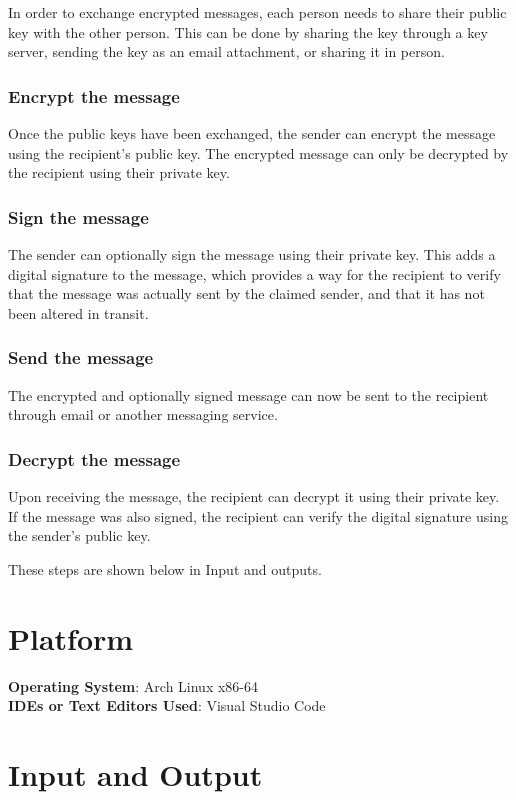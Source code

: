 \documentclass[openany]{book}
\begin{document}
In order to exchange encrypted messages, each person needs to share their public key with the other person. This can be done by sharing the key through a key server, sending the key as an email attachment, or sharing it in person.
\subsubsection{Encrypt the message}

Once the public keys have been exchanged, the sender can encrypt the message using the recipient's public key. The encrypted message can only be decrypted by the recipient using their private key.
\subsubsection{Sign the message}

The sender can optionally sign the message using their private key. This adds a digital signature to the message, which provides a way for the recipient to verify that the message was actually sent by the claimed sender, and that it has not been altered in transit.
\subsubsection{Send the message}

The encrypted and optionally signed message can now be sent to the recipient through email or another messaging service.
\subsubsection{Decrypt the message}

Upon receiving the message, the recipient can decrypt it using their private key. If the message was also signed, the recipient can verify the digital signature using the sender's public key.

These steps are shown below in Input and outputs.

\section{Platform}
\textbf{\textbf{Operating System}}: Arch Linux x86-64 \\
\textbf{\textbf{IDEs or Text Editors Used}}: Visual Studio Code\\

\section{Input and Output}
\end{document}
